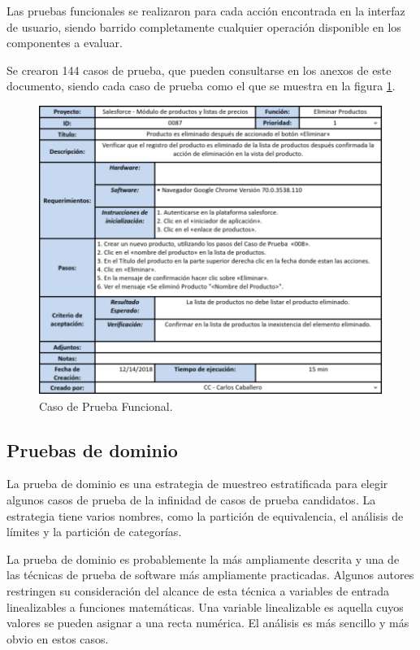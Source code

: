 Las pruebas funcionales se realizaron para cada acción encontrada en la interfaz
de usuario, siendo barrido completamente cualquier operación disponible en los
componentes a evaluar.

Se crearon 144 casos de prueba, que pueden consultarse en los anexos de este
documento, siendo cada caso de prueba como el que se muestra en la figura
\ref{tc_functional}.

\begin{figure}
\centering
\includegraphics[width=1.0\textwidth]{graphics/tc2-functional.eps}
\caption{Caso de Prueba Funcional.}
\label{tc_functional}
\end{figure}

\subsection{Pruebas de dominio}
La prueba de dominio es una estrategia de muestreo estratificada para elegir
algunos casos de prueba de la infinidad de casos de prueba candidatos. La
estrategia tiene varios nombres, como la partición de equivalencia, el análisis
de límites y la partición de categorías.

La prueba de dominio es probablemente la más ampliamente descrita y una de las
técnicas de prueba de software más ampliamente practicadas. Algunos autores
restringen su consideración del alcance de esta técnica a variables de entrada
linealizables a funciones matemáticas. Una variable linealizable es aquella
cuyos valores se pueden asignar a una recta numérica. El análisis es más
sencillo y más obvio en estos casos\cite{Kaner}.


